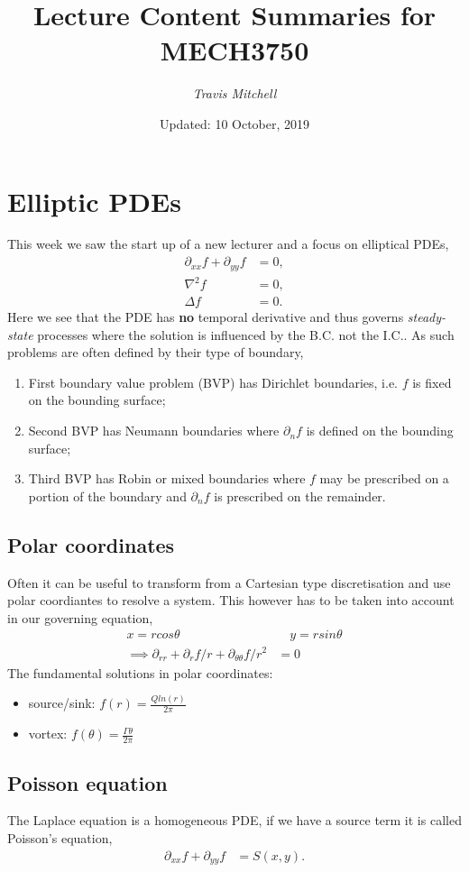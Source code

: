 \documentclass[11pt,a4paper]{report}
\author{\textit{Travis Mitchell}}
\title{Lecture Content Summaries for MECH3750}
\date{Updated: 10 October, 2019}
\theoremstyle{definition}
\begin{document}
	\section{Elliptic PDEs}
		This week we saw the start up of a new lecturer and a focus on elliptical PDEs,
		\begin{align*}
			\partial_{xx} f + \partial_{yy} f &= 0, \\
			\nabla^2 f &= 0, \\
			\Delta f &= 0.
		\end{align*}
		Here we see that the PDE has \textbf{no} temporal derivative and thus governs \textit{steady-state} processes where the solution is influenced by the B.C. not the I.C.. As such problems are often defined by their type of boundary,
		\begin{enumerate}
			\item First boundary value problem (BVP) has Dirichlet boundaries, i.e. $f$ is fixed on the bounding surface;
			\item Second BVP has Neumann boundaries where $\partial_n f$ is defined on the bounding surface;
			\item Third BVP has Robin or mixed boundaries where $f$ may be prescribed on a portion of the boundary and $\partial_n f$ is prescribed on the remainder.
		\end{enumerate}
		\subsection{Polar coordinates}
			Often it can be useful to transform from a Cartesian type discretisation and use polar coordiantes to resolve a system. This however has to be taken into account in our governing equation,
			\begin{align*}
				x = r cos\theta \quad & \quad y=rsin\theta \\
				\implies \partial_{rr} + \partial_r f/r + \partial_{\theta \theta} f / r^2 &= 0
			\end{align*}
			The fundamental solutions in polar coordinates:
			\begin{itemize}
				\item source/sink: $f(r) = \frac{Q ln(r)}{2\pi}$
				\item vortex: $f(\theta) = \frac{\Gamma \theta}{2\pi}$
			\end{itemize}
		\subsection{Poisson equation}
			The Laplace equation is a homogeneous PDE, if we have a source term it is called Poisson's equation,
			\begin{align*}
				\partial_{xx} f + \partial_{yy} f &= S(x,y).
			\end{align*}
\end{document}
